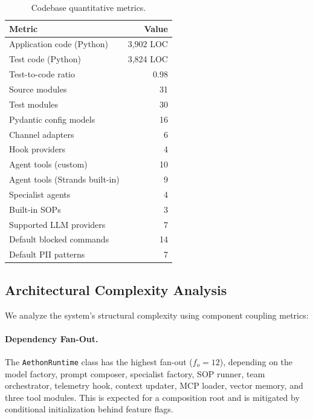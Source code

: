 \documentclass[9pt,twocolumn,letterpaper]{extarticle}
\begin{document}
\begin{table}[t]
\caption{Codebase quantitative metrics.}
\label{tab:metrics}
\centering
\small
\begin{tabular}{@{}lr@{}}
\toprule
\textbf{Metric} & \textbf{Value} \\
\midrule
Application code (Python)       & 3{,}902 LOC \\
Test code (Python)              & 3{,}824 LOC \\
Test-to-code ratio              & 0.98 \\
Source modules                  & 31 \\
Test modules                    & 30 \\
Pydantic config models          & 16 \\
Channel adapters                & 6 \\
Hook providers                  & 4 \\
Agent tools (custom)            & 10 \\
Agent tools (Strands built-in)  & 9 \\
Specialist agents               & 4 \\
Built-in SOPs                   & 3 \\
Supported LLM providers         & 7 \\
Default blocked commands        & 14 \\
Default PII patterns            & 7 \\
\bottomrule
\end{tabular}
\end{table}

\subsection{Architectural Complexity Analysis}

We analyze the system's structural complexity using component coupling metrics:

\paragraph{Dependency Fan-Out.}
The \texttt{AethonRuntime} class has the highest fan-out ($f_o = 12$), depending on the model factory, prompt composer, specialist factory, SOP runner, team orchestrator, telemetry hook, context updater, MCP loader, vector memory, and three tool modules.
This is expected for a composition root and is mitigated by conditional initialization behind feature flags.
\end{document}
